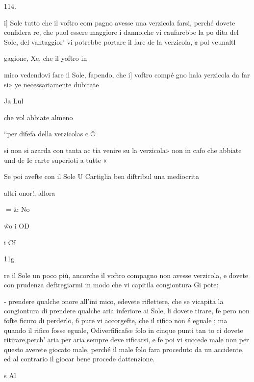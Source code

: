 \documentclass[12pt,a6paper]{article}
\begin{document}
 

 

 

 

 

 

 

114.

i] Sole tutto che il voftro com
pagno avesse una verzicola
farsi, perché dovete confidera
re, che puol essere maggiore i
danno,che vi caufarebbe la po
dita del Sole, del vantaggior’
vi potrebbe portare il fare de
la verzicola, ¢ pol veunaltl

gagione, Xe, che il yoftro in

mico vedendovi fare il Sole,
fapendo, che i] voftro compé
gno hala yerzicola da far si»
ye necessariamente dubitate

Ja Lul

che vol abbiate almeno

“per difefa della verzicolas ¢ ©

si non si azarda con tanta ac
tia venire su la verzicola»
non in cafo che abbiate und de
Ie carte superioti a tutte «

Se poi avefte con il Sole U
Cartiglia ben diftribul
una mediocrita

altri onor!, allora

 
= & No

\~ wo i OD

i
Cf

11g

re il Sole un poco più, ancorche
il voftro compagno non avesse
verzicola, e dovete con prudenza deftregiarmi in modo che
vi capitila congiontura Gi pote:

- prendere qualche onore all’ini
mico, edevete riflettere, che
se vicapita la congiontura di
prendere qualche aria inferiore
ai Sole, li dovete tirare, fe pero non fofte ficuro di perderlo,
6 pure vi accorgefte, che il
rifico non é eguale ; ma quando
il rifico fosse eguale, Odiverfificafse folo in cinque punti tan
to ci dovete ritirare,perch’ aria
per aria sempre deve rificarsi, e
fe poi vi succede male non per
questo averete giocato male,
perché il male folo fara proceduto da un accidente, ed al contrario il giocar bene procede
dattenzione.

s Al

 

 

 

 
 

 
\end{document}
